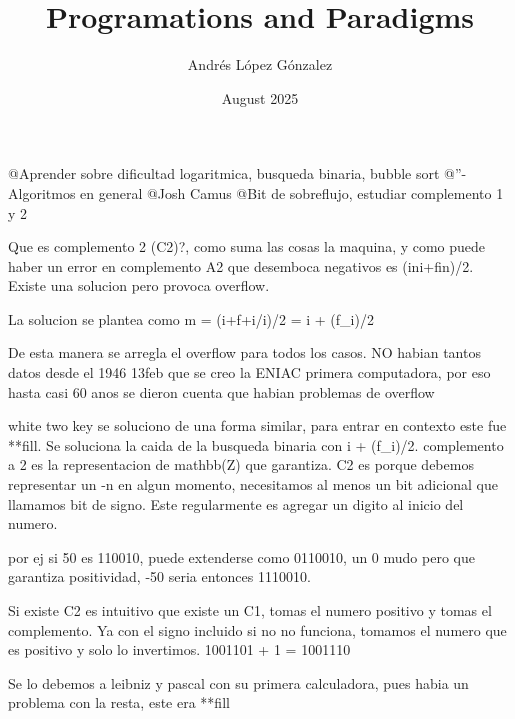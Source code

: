 \documentclass{article}
\title{Programations and Paradigms}
\author{Andrés López Gónzalez}
\date{August 2025}
\begin{document}
@Aprender sobre dificultad logaritmica, busqueda binaria, bubble sort
@''- Algoritmos en general
@Josh Camus
@Bit de sobreflujo, estudiar complemento 1 y 2

Que es complemento 2 (C2)?, como suma las cosas la maquina, y como puede haber un error en complemento A2 que desemboca negativos es (ini+fin)/2.
Existe una solucion pero provoca overflow.

La solucion se plantea como m = (i+f+i/i)/2 = i + (f_i)/2

De esta manera se arregla el overflow para todos los casos.
NO habian tantos datos desde el 1946 13feb que se creo la ENIAC primera computadora, por eso hasta casi 60 anos se dieron cuenta que habian problemas de overflow

white two key se soluciono de una forma similar, para entrar en contexto este fue **fill. Se soluciona la caida de la busqueda binaria con i + (f_i)/2.
complemento a 2 es la representacion de mathbb(Z) que garantiza. C2 es porque debemos representar un -n en algun momento, necesitamos al menos un bit adicional que llamamos bit de signo. Este regularmente es agregar un digito al inicio del numero.

por ej si 50 es 110010, puede extenderse como 0110010, un 0 mudo pero que garantiza positividad, -50 seria entonces 1110010.

Si existe C2 es intuitivo que existe un C1, tomas el numero positivo y tomas el complemento. Ya con el signo incluido si no no funciona, tomamos el numero que es positivo y solo lo invertimos.
1001101
+     1 = 1001110

Se lo debemos a leibniz y pascal con su primera calculadora, pues habia un problema con la resta, este era **fill
\end{document}
